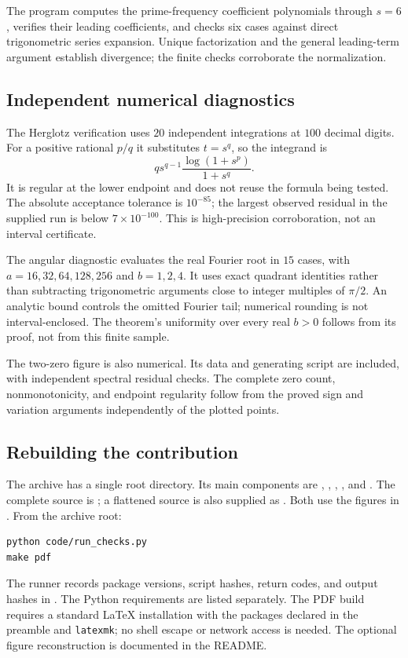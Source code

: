 \begin{description}[style=nextline,leftmargin=0pt,labelwidth=0pt,labelsep=0pt]
\item[Divergence coefficients.]
The program  computes the
prime-frequency coefficient polynomials through $s=6$, verifies their
leading coefficients, and checks six cases against direct trigonometric
series expansion. Unique factorization and the general leading-term
argument establish divergence; the finite checks corroborate the
normalization.
\end{description}

\subsection{Independent numerical diagnostics}

The Herglotz verification uses $20$ independent integrations at $100$
decimal digits. For a positive rational $p/q$ it substitutes $t=s^q$,
so the integrand is
\[
q s^{q-1}\frac{\log(1+s^p)}{1+s^q}.
\]
It is regular at the lower endpoint and does not reuse the formula
being tested. The absolute acceptance tolerance is $10^{-85}$; the
largest observed residual in the supplied run is below $7\times10^{-100}$.
This is high-precision corroboration, not an interval certificate.

The angular diagnostic evaluates the real Fourier root in $15$ cases,
with $a=16,32,64,128,256$ and $b=1,2,4$. It uses exact quadrant
identities rather than subtracting trigonometric arguments close to
integer multiples of $\pi/2$. An analytic bound controls the omitted
Fourier tail; numerical rounding is not interval-enclosed. The theorem's
uniformity over every real $b>0$ follows from its proof, not from this
finite sample.

The two-zero figure is also numerical. Its data and generating script
are included, with independent spectral residual checks. The complete
zero count, nonmonotonicity, and endpoint regularity follow from the
proved sign and variation arguments independently of the plotted points.

\subsection{Rebuilding the contribution}

The archive has a single root directory. Its main components are
, , , , and
. The complete source is
; a flattened source is also supplied as
. Both use the figures in
. From the archive root:
\begin{verbatim}
python code/run_checks.py
make pdf
\end{verbatim}
The runner records package versions, script hashes, return codes, and
output hashes in . The Python
requirements are listed separately. The PDF build requires a standard
LaTeX installation with the packages declared in the preamble and
\texttt{latexmk}; no shell escape or network access is needed.
The optional figure reconstruction is documented in the README.

